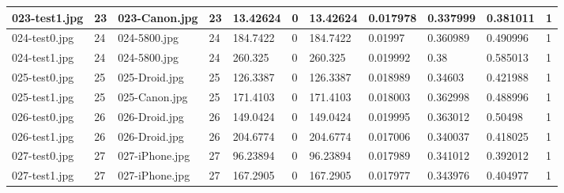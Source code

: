 \begin{landscape}
\begin{longtable}{|p{2cm}|p{1cm}|p{2cm}|p{1cm}|p{2cm}|p{1cm}|p{2cm}|p{2cm}|p{2cm}|p{2cm}|p{1cm}|}
	023-test1.jpg   & 23               & 023-Canon.jpg         & 23                          & 13.42624              & 0                       & 13.42624                   & 0.017978              & 0.337999              & 0.381011                 & 1                \\ \hline
	024-test0.jpg   & 24               & 024-5800.jpg          & 24                          & 184.7422              & 0                       & 184.7422                   & 0.01997               & 0.360989              & 0.490996                 & 1                \\ \hline
	024-test1.jpg   & 24               & 024-5800.jpg          & 24                          & 260.325               & 0                       & 260.325                    & 0.019992              & 0.38                  & 0.585013                 & 1                \\ \hline
	025-test0.jpg   & 25               & 025-Droid.jpg         & 25                          & 126.3387              & 0                       & 126.3387                   & 0.018989              & 0.34603               & 0.421988                 & 1                \\ \hline
	025-test1.jpg   & 25               & 025-Canon.jpg         & 25                          & 171.4103              & 0                       & 171.4103                   & 0.018003              & 0.362998              & 0.488996                 & 1                \\ \hline
	026-test0.jpg   & 26               & 026-Droid.jpg         & 26                          & 149.0424              & 0                       & 149.0424                   & 0.019995              & 0.363012              & 0.50498                  & 1                \\ \hline
	026-test1.jpg   & 26               & 026-Droid.jpg         & 26                          & 204.6774              & 0                       & 204.6774                   & 0.017006              & 0.340037              & 0.418025                 & 1                \\ \hline
	027-test0.jpg   & 27               & 027-iPhone.jpg        & 27                          & 96.23894              & 0                       & 96.23894                   & 0.017989              & 0.341012              & 0.392012                 & 1                \\ \hline
	027-test1.jpg   & 27               & 027-iPhone.jpg        & 27                          & 167.2905              & 0                       & 167.2905                   & 0.017977              & 0.343976              & 0.404977                 & 1                \\ \hline

\end{longtable}
\end{landscape}
